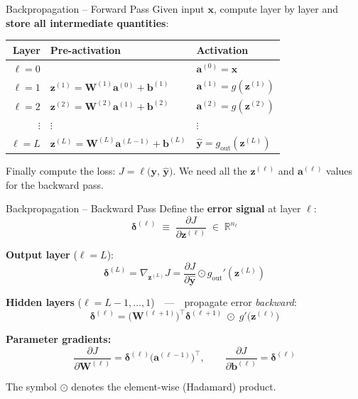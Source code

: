 \documentclass[aspectratio=169,11pt]{beamer}
\newcommand{\x}{\bm{x}}
\newcommand{\bb}{\bm{b}}
\newcommand{\z}{\bm{z}}
\newcommand{\W}{\bm{W}}
\renewcommand{\a}{\bm{a}}
\newcommand{\R}{\mathbb{R}}
\begin{document}
\begin{frame}{Backpropagation -- Forward Pass}
Given input $\x$, compute layer by layer and \textbf{store all intermediate quantities}:

\vspace{0.3cm}
\begin{center}
\renewcommand{\arraystretch}{1.4}
\begin{tabular}{rll}
\toprule
\textbf{Layer} & \textbf{Pre-activation} & \textbf{Activation} \\
\midrule
$\ell = 0$ & & $\a^{(0)} = \x$ \\
$\ell = 1$ & $\z^{(1)} = \W^{(1)}\a^{(0)} + \bb^{(1)}$ & $\a^{(1)} = g(\z^{(1)})$ \\
$\ell = 2$ & $\z^{(2)} = \W^{(2)}\a^{(1)} + \bb^{(2)}$ & $\a^{(2)} = g(\z^{(2)})$ \\
$\vdots$ & $\vdots$ & $\vdots$ \\
$\ell = L$ & $\z^{(L)} = \W^{(L)}\a^{(L-1)} + \bb^{(L)}$ & $\hat{\bm{y}} = g_{\text{out}}(\z^{(L)})$ \\
\bottomrule
\end{tabular}
\end{center}

\vspace{0.2cm}
Finally compute the loss: $J = \ell\big(\bm{y},\, \hat{\bm{y}}\big)$.
We need all the $\z^{(\ell)}$ and $\a^{(\ell)}$ values for the backward pass.
\end{frame}

\begin{frame}{Backpropagation -- Backward Pass}
Define the \textbf{error signal} at layer $\ell$:
\[
    \bm{\delta}^{(\ell)} \;\equiv\; \frac{\partial J}{\partial \z^{(\ell)}} \;\in\;\R^{n_\ell}
\]

\vspace{0.2cm}
\textbf{Output layer} ($\ell = L$):
\[
    \bm{\delta}^{(L)} = \nabla_{\!\z^{(L)}} J = \frac{\partial J}{\partial \hat{\bm{y}}}\odot g_{\text{out}}'(\z^{(L)})
\]

\textbf{Hidden layers} ($\ell = L{-}1, \dots, 1$)~~---~~propagate error \textit{backward}:
\[
    \boxed{\bm{\delta}^{(\ell)} = \big(\W^{(\ell+1)}\big)^{\!\top}\bm{\delta}^{(\ell+1)} \;\odot\; g'\!\big(\z^{(\ell)}\big)}
\]

\textbf{Parameter gradients:}
\[
    \frac{\partial J}{\partial \W^{(\ell)}} = \bm{\delta}^{(\ell)}\big(\a^{(\ell-1)}\big)^{\!\top}, \qquad
    \frac{\partial J}{\partial \bb^{(\ell)}} = \bm{\delta}^{(\ell)}
\]

{\small The symbol $\odot$ denotes the element-wise (Hadamard) product.}
\end{frame}
\end{document}
